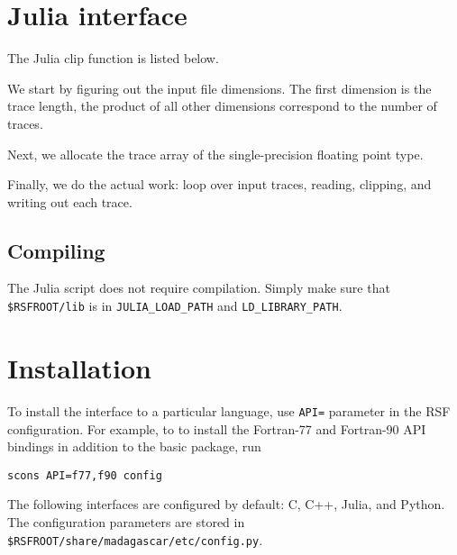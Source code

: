 \section{Julia interface}

\lstset{language=julia}
\renewcommand{\rsfclip}{\RSF/api/julia/test/clip.jl}

The Julia clip function is listed below.



 We
start by figuring out the input file dimensions. The first dimension
is the trace length, the product of all other dimensions correspond to
the number of traces.


Next, we allocate the trace array of the single-precision floating point type.


Finally, we do the actual work: loop over input traces, reading,
clipping, and writing out each trace.

\subsection{Compiling}

The Julia script does not require compilation. Simply make sure that
\texttt{\$RSFROOT/lib} is in \texttt{JULIA\_LOAD\_PATH} and
\texttt{LD\_LIBRARY\_PATH}.

\section{Installation} 

To install the interface to a particular language, use \texttt{API=}
parameter in the RSF configuration. For example, to to install the
Fortran-77 and Fortran-90 API bindings in addition to the basic package, run
\begin{verbatim}
scons API=f77,f90 config
\end{verbatim}
The following interfaces are configured by default: C, C++, Julia, and
Python. The configuration parameters are stored in
\texttt{\$RSFROOT/share/madagascar/etc/config.py}.

 


